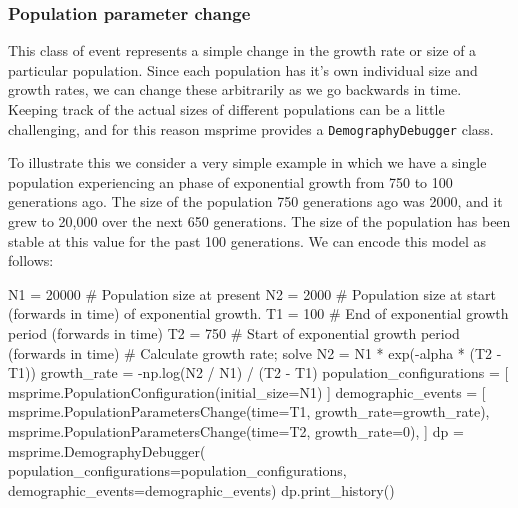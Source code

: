 \documentclass[graybox]{svmult}
\begin{document}
\subsubsection{Population parameter change}\label{population-parameter-change}

This class of event represents a simple change in the growth rate or
size of a particular population. Since each population has it's own
individual size and growth rates, we can change these arbitrarily as we
go backwards in time. Keeping track of the actual sizes of different
populations can be a little challenging, and for this reason msprime
provides a \texttt{DemographyDebugger} class.

To illustrate this we consider a very simple example in which we have a
single population experiencing an phase of exponential growth from 750
to 100 generations ago. The size of the population 750 generations ago
was 2000, and it grew to 20,000 over the next 650 generations. The size
of the population has been stable at this value for the past 100
generations. We can encode this model as follows:

\begin{pythoncode}
N1 = 20000  # Population size at present
N2 = 2000   # Population size at start (forwards in time) of exponential growth.
T1 = 100    # End of exponential growth period (forwards in time)
T2 = 750    # Start of exponential growth period (forwards in time)
# Calculate growth rate; solve N2 = N1 * exp(-alpha * (T2 - T1))
growth_rate = -np.log(N2 / N1) / (T2 - T1)
population_configurations = [
    msprime.PopulationConfiguration(initial_size=N1)
]
demographic_events = [
    msprime.PopulationParametersChange(time=T1, growth_rate=growth_rate),
    msprime.PopulationParametersChange(time=T2, growth_rate=0),
]
dp = msprime.DemographyDebugger(
    population_configurations=population_configurations,
    demographic_events=demographic_events)
dp.print_history()
\end{pythoncode}
\end{document}
